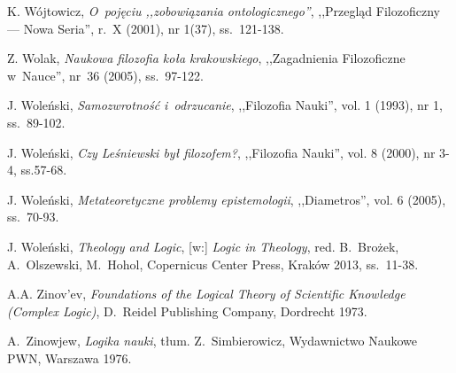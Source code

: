 \begin{thebibliography}{100}
K. Wójtowicz, \textit{O~pojęciu ,,zobowiązania ontologicznego''}, ,,Przegląd Filozoficzny — Nowa Seria'', r.~X (2001), nr 1(37), ss.~121-138.

Z. Wolak, \textit{Naukowa filozofia koła krakowskiego}, ,,Zagadnienia Filozoficzne w~Nauce'', nr~36 (2005), ss.~97-122.

J. Woleński, \textit{Samozwrotność i~odrzucanie}, ,,Filozofia Nauki'', vol. 1 (1993), nr 1, ss.~89-102.

J. Woleński, \textit{Czy Leśniewski był filozofem?}, ,,Filozofia Nauki'', vol. 8 (2000), nr 3-4, ss.57-68.

J. Woleński, \textit{Metateoretyczne problemy epistemologii}, ,,Diametros'', vol. 6 (2005), ss.~70-93.

J. Woleński, \textit{Theology and Logic}, [w:] \textit{Logic in Theology}, red. B.~Brożek, A.~Olszewski, M.~Hohol,
Copernicus Center Press, Kraków 2013, ss.~11-38.






A.A. Zinov'ev, \textit{Foundations of the Logical Theory of Scientific Knowledge (Complex Logic)}, D.~Reidel Publishing Company, Dordrecht 1973.

A.~Zinowjew, \textit{Logika nauki}, tłum. Z.~Simbierowicz, Wydawnictwo Naukowe PWN, Warszawa 1976.

\end{thebibliography}
